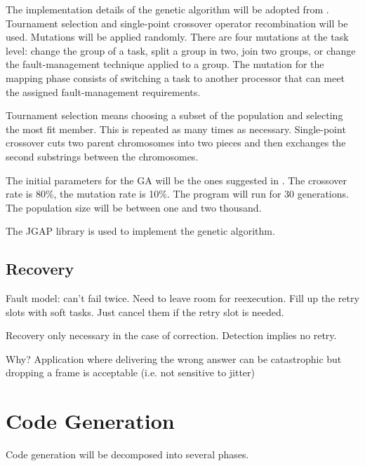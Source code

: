 \documentclass{article}
\begin{document}
The implementation details of the genetic algorithm will be adopted from \cite{bolchini2013reliability}. Tournament selection and single-point crossover operator recombination will be used. Mutations will be applied randomly. There are four mutations at the task level: change the group of a task, split a group in two, join two groups, or change the fault-management technique applied to a group. The mutation for the mapping phase consists of switching a task to another processor that can meet the assigned fault-management requirements.

Tournament selection means choosing a subset of the population and selecting the most fit member. This is repeated as many times as necessary. Single-point crossover cuts two parent chromosomes into two pieces and then exchanges the second substrings between the chromosomes. 

The initial parameters for the GA will be the ones suggested in \cite{bolchini2010multi}. The crossover rate is 80\%, the mutation rate is 10\%. The program will run for 30 generations. The population size will be between one and two thousand.

The JGAP library \cite{jgap} is used to implement the genetic algorithm. 

\subsection{Recovery}
Fault model: can't fail twice.
Need to leave room for reexecution. 
Fill up the retry slots with soft tasks. Just cancel them if the retry slot is needed.

Recovery only necessary in the case of correction. Detection implies no retry. 

Why? Application where delivering the wrong answer can be catastrophic but dropping a frame is acceptable (i.e. not sensitive to jitter)

\section{Code Generation}

Code generation will be decomposed into several phases.





\end{document}
